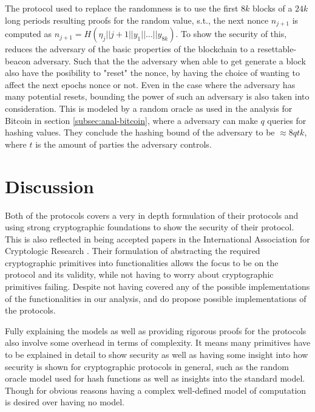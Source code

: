 The protocol used to replace the randomness is to use the first $8k$ blocks of a $24k$ long periods resulting proofs for the random value, s.t., the next nonce $n_{j+1}$ is computed as $n_{j+1} = H(\eta_j || j+1 || y_1 || \dots || y_{8k})$. To show the security of this, \cite{ouroboros-praos} reduces the adversary of the basic properties of the blockchain to a resettable-beacon adversary. Such that the the adversary when able to get generate a block also have the posibility to "reset" the nonce, by having the choice of wanting to affect the next epochs nonce or not. Even in the case where the adversary has many potential resets, bounding the power of such an adversary is also taken into consideration. This is modeled by a random oracle as used in the analysis for Bitcoin in section \ref{subsec:anal-bitcoin}, where a adversary can make $q$ queries for hashing values. They conclude the hashing bound of the adversary to be $\approx 8qtk$, where $t$ is the amount of parties the adversary controls.


\section{Discussion}

Both of the protocols covers a very in depth formulation of their protocols and using strong cryptographic foundations to show the security of their protocol. This is also reflected in being accepted papers in the International Association for Cryptologic Research \cite{iacr-ouro} \cite{iacr-praos}. Their formulation of abstracting the required cryptographic primitives into functionalities allows the focus to be on the protocol and its validity, while not having to worry about cryptographic primitives failing. Despite not having covered any of the possible implementations of the functionalities in our analysis, \cite{ouroboros} and \cite{ouroboros-praos} do propose possible implementations of the protocols.

Fully explaining the models as well as providing rigorous proofs for the protocols also involve some overhead in terms of complexity. It means many primitives have to be explained in detail to show security as well as having some insight into how security is shown for cryptographic protocols in general, such as the random oracle model used for hash functions as well as insights into the standard model. Though for obvious reasons having a complex well-defined model of computation is desired over having no model. 

